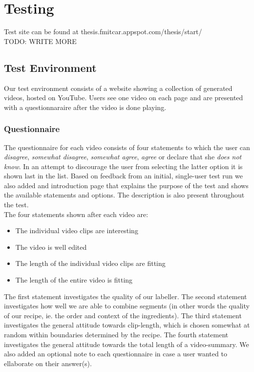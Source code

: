 %
\section{Testing}
%
Test site can be found at thesis.fmitcar.appspot.com/thesis/start/\\
TODO: WRITE MORE
%
\subsection{Test Environment}
%
Our test environment consists of a website showing a collection of generated videos, hosted on YouTube. Users see one video on each page and are presented with a questionnaraire after the video is done playing.
%
\subsubsection{Questionnaire}
%
%
The questionnaire for each video consists of four statements to which the user can \textit{disagree}, \textit{somewhat disagree}, \textit{somewhat agree}, \textit{agree} or declare that she \textit{does not know}. In an attempt to discourage the user from selecting the latter option it is shown last in the list. Based on feedback from an initial, single-user test run we also added and introduction page that explains the purpose of the test and shows the available statements and options. The description is also present throughout the test.\\
%
The four statements shown after each video are:
%
\begin{itemize}
\item The individual video clips are interesting
\item The video is well edited
\item The length of the individual video clips are fitting
\item The length of the entire video is fitting
\end{itemize}
%
The first statement investigates the quality of our labeller. The second statement investigates how well we are able to combine segments (in other words the quality of our recipe, ie. the order and context of the ingredients). The third statement investigates the general attitude towards clip-length, which is chosen somewhat at random within boundaries determined by the recipe. The fourth statement investigates the general attitude towards the total length of a video-summary. We also added an optional note to each questionnaire in case a user wanted to ellaborate on their answer(s).
%
